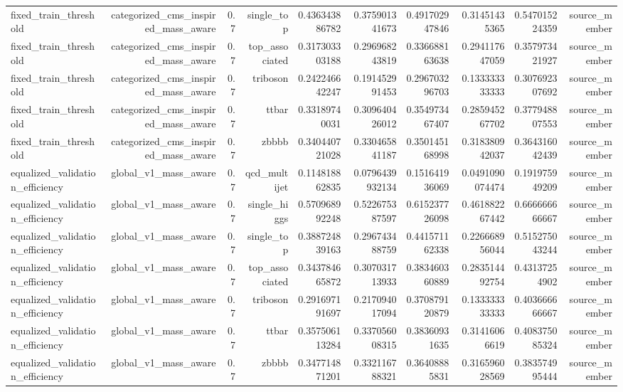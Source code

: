 \begin{table}[htbp]
{\begin{tabular}{lrrrrrrrrr}
fixed\_train\_threshold & categorized\_cms\_inspired\_mass\_aware & 0.7 & single\_top & 0.436343886782 & 0.375901341673 & 0.491702947846 & 0.31451435365 & 0.547015224359 & source\_member \\
fixed\_train\_threshold & categorized\_cms\_inspired\_mass\_aware & 0.7 & top\_associated & 0.317303303188 & 0.296968243819 & 0.336688163638 & 0.294117647059 & 0.357973421927 & source\_member \\
fixed\_train\_threshold & categorized\_cms\_inspired\_mass\_aware & 0.7 & triboson & 0.242246642247 & 0.191452991453 & 0.296703296703 & 0.133333333333 & 0.307692307692 & source\_member \\
fixed\_train\_threshold & categorized\_cms\_inspired\_mass\_aware & 0.7 & ttbar & 0.33189740031 & 0.309640426012 & 0.354973467407 & 0.285945267702 & 0.377948807553 & source\_member \\
fixed\_train\_threshold & categorized\_cms\_inspired\_mass\_aware & 0.7 & zbbbb & 0.340440721028 & 0.330465841187 & 0.350145168998 & 0.318380942037 & 0.364316042439 & source\_member \\
equalized\_validation\_efficiency & global\_v1\_mass\_aware & 0.7 & qcd\_multijet & 0.114818862835 & 0.0796439932134 & 0.151641936069 & 0.0491090074474 & 0.191975949209 & source\_member \\
equalized\_validation\_efficiency & global\_v1\_mass\_aware & 0.7 & single\_higgs & 0.570968992248 & 0.522675387597 & 0.615237726098 & 0.461882267442 & 0.666666666667 & source\_member \\
equalized\_validation\_efficiency & global\_v1\_mass\_aware & 0.7 & single\_top & 0.388724839163 & 0.296743488759 & 0.441571162338 & 0.226668956044 & 0.515275043244 & source\_member \\
equalized\_validation\_efficiency & global\_v1\_mass\_aware & 0.7 & top\_associated & 0.343784665872 & 0.307031713933 & 0.383460360889 & 0.283514492754 & 0.43137254902 & source\_member \\
equalized\_validation\_efficiency & global\_v1\_mass\_aware & 0.7 & triboson & 0.291697191697 & 0.217094017094 & 0.370879120879 & 0.133333333333 & 0.403666666667 & source\_member \\
equalized\_validation\_efficiency & global\_v1\_mass\_aware & 0.7 & ttbar & 0.357506113284 & 0.337056008315 & 0.38360931635 & 0.31416066619 & 0.408375085324 & source\_member \\
equalized\_validation\_efficiency & global\_v1\_mass\_aware & 0.7 & zbbbb & 0.347714871201 & 0.332116788321 & 0.36408885831 & 0.316596028569 & 0.383574995444 & source\_member \\

\end{tabular}}
\end{table}
